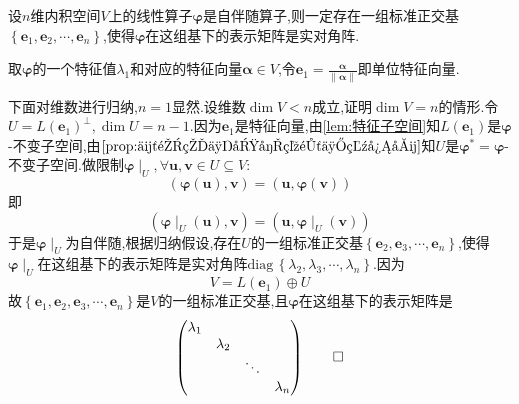 \begin{formal}
    \begin{theorem}[实对角阵表示矩阵的存在性]\label{thm:实对角阵表示矩阵的存在性}
        设$n$维内积空间$V$上的线性算子$\bm{\varphi}$是自伴随算子,则一定存在一组标准正交基$\left\{
            \bm{e}_1,\bm{e}_2,\cdots,\bm{e}_n
        \right\}$,使得$\bm{\varphi}$在这组基下的表示矩阵是实对角阵.
    \end{theorem}
    \begin{Proof}
        取$\bm{\varphi}$的一个特征值$\lambda_1$和对应的特征向量$\bm{\alpha}\in V$,令$\displaystyle\bm{e}_1=\frac{\bm{\alpha}}{\left\lVert\bm{\alpha}\right\rVert}$即单位特征向量.

        下面对维数进行归纳,$n=1$显然.设维数$\dim V<n$成立,证明$\dim V=n$的情形.令$U=L\left(\bm{e}_1\right)^{\perp},\dim U=n-1$.因为$\bm{e}_1$是特征向量,由\cref{lem:特征子空间}知$L\left(\bm{e}_1\right)$是$\bm{\varphi}$-不变子空间,由$\cref{prop:伴随的不变子空间与特征值}$知$U$是$\bm{\varphi}^*=\bm{\varphi}$-不变子空间.做限制$\bm{\varphi}\mid_{U},\forall\bm{u},\bm{v}\in U\subseteq V:$\[
        \left(
            \bm{\varphi}\left(\bm{u}\right),\bm{v}
        \right)=\left(
            \bm{u},\bm{\varphi}\left(\bm{v}\right)
        \right)
        \]即\[
        \left(
            \bm{\varphi}\mid_U\left(
                \bm{u}
            \right),\bm{v}
        \right)=\left(
            \bm{u},\bm{\varphi}\mid_U\left(
                \bm{v}
            \right)
        \right)
        \]于是$\bm{\varphi}\mid_U$为自伴随,根据归纳假设,存在$U$的一组标准正交基$\left\{
            \bm{e}_2,\bm{e}_3,\cdots,\bm{e}_n
            \right\}$,使得$\bm{\varphi}\mid_U$在这组基下的表示矩阵是实对角阵$\mathrm{diag}\,\left\{\lambda_2,\lambda_3,\cdots,\lambda_n\right\}$.因为\[
            V=L\left(
                \bm{e}_1
            \right)\oplus U
            \]故$\left\{
                \bm{e}_1,\bm{e}_2,\bm{e}_3,\cdots,\bm{e}_n
            \right\}$是$V$的一组标准正交基,且$\bm{\varphi}$在这组基下的表示矩阵是\[
            \begin{pmatrix}
                \lambda_1&&&\\
                &\lambda_2&&\\
                &&\ddots&\\
                &&&\lambda_n
            \end{pmatrix}\qedhere
            \]
    \end{Proof}
\end{formal}
